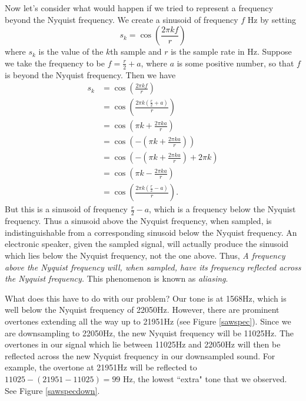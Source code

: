 Now let's consider what would happen if we tried to represent a frequency beyond the Nyquist frequency. We create a sinusoid of frequency $f$ Hz by setting
$$s_k = \cos\left(\frac{2\pi kf}r\right)$$
where $s_k$ is the value of the $k$th sample and $r$ is the sample rate in Hz. Suppose we take the frequency to be $f=\frac{r}2+a$, where $a$ is some positive number, so that $f$ is beyond the Nyquist frequency. Then we have
\begin{align*}
s_k &= \cos\left(\frac{2\pi kf}r\right) \\
&= \cos\left(\frac{2\pi k(\frac{r}2+a)}r\right)\\
&= \cos\left(\pi k+\frac{2\pi ka}r\right)\\
&= \cos\left(-\left(\pi k+\frac{2\pi ka}r\right)\right)\\
&= \cos\left(-\left(\pi k+\frac{2\pi ka}r\right)+2\pi k \right)\\
&= \cos\left(\pi k-\frac{2\pi ka}r\right)\\
&= \cos\left(\frac{2\pi k(\frac{r}2-a)}r\right).
\end{align*}
But this is a sinusoid of frequency $\frac{r}2-a$, which is a frequency below the Nyquist frequency. Thus a sinusoid above the Nyquist frequency, when sampled, is indistinguishable from a corresponding sinusoid below the Nyquist frequency. An electronic speaker, given the sampled signal, will actually produce the sinusoid which lies below the Nyquist frequency, not the one above. Thus,
\emph{A frequency above the Nyquist frequency will, when sampled, have its frequency reflected across the Nyquist frequency.}
This phenomenon is known as \emph{aliasing}.

What does this have to do with our problem? Our tone is at 1568Hz, which is well below the Nyquist frequency of 22050Hz. However, there are prominent overtones extending all the way up to 21951Hz (see Figure \ref{sawspec}). Since we are downsampling to 22050Hz, the new Nyquist frequency will be 11025Hz. The overtones in our signal which lie between 11025Hz and 22050Hz will then be reflected across the new Nyquist frequency in our downsampled sound. For example, the overtone at 21951Hz will be reflected to $11025-(21951-11025)=99$ Hz, the lowest ``extra" tone that we observed. See Figure \ref{sawspecdown}.

